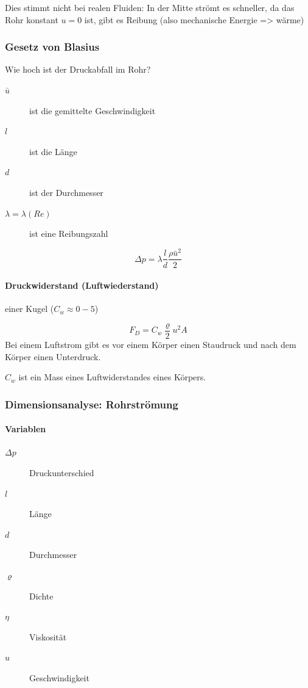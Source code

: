 \documentclass[a4paper]{scrartcl}
\begin{document}
Dies stimmt nicht bei realen Fluiden: In der Mitte strömt es schneller, da das Rohr konstant $u=0$ ist, gibt es Reibung (also mechanische Energie => wärme)


\subsubsection{Gesetz von Blasius}

Wie hoch ist der Druckabfall im Rohr?

\begin{description}
	\item[$\bar{u}$] ist die gemittelte Geschwindigkeit
	\item[$l$] ist die Länge
	\item[$d$] ist der Durchmesser
	\item[$\lambda = \lambda(Re)$] ist eine Reibungszahl %
\end{description}

\[
	\Delta p = \lambda \frac{l}{d}\frac{\rho \bar{u}^2}{2}
\]






\paragraph{Druckwiderstand (Luftwiederstand)} einer Kugel ($C_w \approx 0-5$)

\[
	F_D = C_w \frac{\varrho}{2} u^2 A
\]
Bei einem Luftstrom gibt es vor einem Körper einen Staudruck und nach dem Körper einen Unterdruck.


$C_w$ ist ein Mass eines Luftwiderstandes eines Körpers.


\subsubsection{Dimensionsanalyse: Rohrströmung}
\paragraph{Variablen}
\begin{description}
	
\item[$\Delta p$] Druckunterschied
\item[$l$] Länge
\item[$d$] Durchmesser
\item[$\varrho$] Dichte
\item[$\eta$] Viskosität
\item[$u$] Geschwindigkeit
\end{description}
\end{document}
